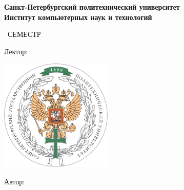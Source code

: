 
\begin{titlepage}
	\clearpage\thispagestyle{empty}
	\centering
	
	\textbf{Санкт-Петербургский политехнический университет\\Институт компьютерных
	наук и технологий}
	\vspace{33ex}
	
	{\textbf{\FullCourseNameFirstPart}}
	
	\SemesterNumber\ СЕМЕСТР  
	\vspace{1ex}
	
	Лектор: \textit{\LecturerInitials}
	
	\includegraphics[width=0.4\textwidth]{images/poly_logo.png}

	\begin{flushright}
		\noindent
		Автор: \textit{\AuthorInitials}
		\\
	\end{flushright}
	
	\vfill
	\CourseDate
	\pagebreak
\end{titlepage}
